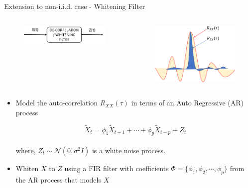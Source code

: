 \documentclass[10pt,xcolor=table]{beamer}
\begin{document}
\begin{frame}{Extension to non-i.i.d. case - Whitening Filter}

\begin{columns}
	
\begin{figure}[t]
	\begin{center}
		\includegraphics[width=2.0in]{whitening_block_diag.png}
	\end{center}
\end{figure}


\begin{figure}[t]
	\begin{center}
	\includegraphics[width=2.0in]{autocorr_whiten.png}
	\end{center}
\end{figure}

\end{columns}


\begin{block}{}
	\begin{itemize}
	\item Model the auto-correlation $R_{XX}(\tau)$ in terms of an Auto Regressive (AR) process
		
		\[ \tilde{X}_t = \phi_1 \tilde{X}_{t-1} + \cdots + \phi_p \tilde{X}_{t-p} + Z_t \]\\
		where, $Z_t \sim \mathcal{N}(0,\sigma^2 I)$ is a white noise process. 

	\item Whiten $X$ to $Z$ using a FIR filter with coefficients $\Phi = \{\phi_1, \phi_2, \cdots, \phi_p\}$ from the AR process that models $X$
	\end{itemize}
\end{block}
\end{frame}
\end{document}
